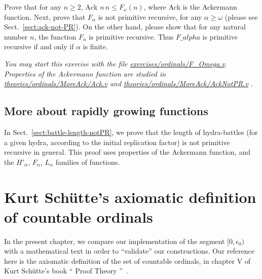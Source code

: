\begin{exercise}



Prove that for any $n\geq 2$, $\textrm{Ack}\,\,n\,n\leq  F_\omega(n)$, where \textrm{Ack} is the Ackermann function. Next, prove that $F_\alpha$ is not primitive recursive, for any $\alpha\geq\omega$  (please see Sect.~\vref{sect:ack-not-PR}).
On the other hand, please show that for any natural number $n$, the function $F_n$ is primitive recursive.
Thus $F\_alpha$ is primitive recursive if and only if $\alpha$ is finite.

\emph{You may start this exercise with the file
    \href{https://github.com/coq-community/hydra-battles/tree/master/exercises/ordinals/F_omega.v}{exercises/ordinals/F\_Omega.v}.
Properties of the Ackermann function are studied in
    \href{https://github.com/coq-community/hydra-battles/tree/master/theories/ordinals/MoreAck/Ack.v}{theories/ordinals/MoreAck/Ack.v} and
    \href{https://github.com/coq-community/hydra-battles/tree/master/theories/ordinals/MoreAck/AckNotPR.v}{theories/ordinals/MoreAck/AckNotPR.v}
.}
\end{exercise} 

\section{More about rapidly growing functions}

In Sect.~\vref{sect:battle-length-notPR}, we prove that the length of hydra-battles (for a given hydra, according to the initial replication factor) is not primitive recursive in general. 
This proof uses properties of the Ackermann function, and the $H'_\alpha$, $F_\alpha$, $L_\alpha$ families of functions.










\chapter[Countable ordinals (after Sch\"{u}tte)]{Kurt Schütte's axiomatic definition of countable ordinals}

\label{chap:schutte} 

In the present chapter, we  compare our implementation of the segment $[0,\epsilon_0)$ with a mathematical text in order to ``validate'' our constructions.
Our reference here is the axiomatic definition of the set of countable ordinals,
in chapter V of Kurt Schütte's book `` Proof Theory ''~\cite{schutte}.

